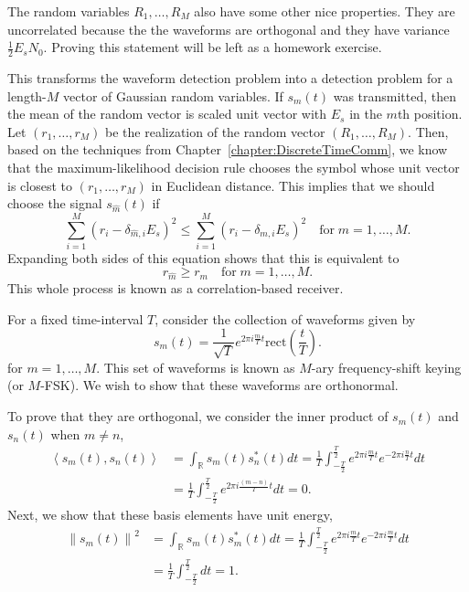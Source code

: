 The random variables $R_1, \ldots , R_M$ also have some other nice properties.
They are uncorrelated because the the waveforms are orthogonal and they have variance $\frac{1}{2}E_s N_0$.
Proving this statement will be left as a homework exercise.

This transforms the waveform detection problem into a detection problem for a length-$M$ vector of Gaussian random variables.
If $s_m (t)$ was transmitted, then the mean of the random vector is scaled unit vector with $E_s$ in the $m$th position.
Let $(r_1, \ldots, r_M)$ be the realization of the random vector $(R_1,\ldots,R_M)$.
Then, based on the techniques from Chapter~\ref{chapter:DiscreteTimeComm}, we know that the maximum-likelihood decision rule chooses the symbol whose unit vector is closest to $(r_1,\ldots,r_M)$ in Euclidean distance.
This implies that we should choose the signal $s_{\hat{m}}(t)$ if
\[ \sum_{i=1}^M (r_i - \delta_{\hat{m},i} E_s)^2 \leq \sum_{i=1}^M (r_i - \delta_{m,i} E_s)^2 \quad \mathrm{for}\; m=1,\ldots,M. \]
Expanding both sides of this equation shows that this is equivalent to
\[ r_{\hat{m}} \geq r_m \quad \mathrm{for}\; m=1,\ldots,M. \]
This whole process is known as a correlation-based receiver.


\begin{example} \label{example:TSpacedTruncatedSinusoids}
For a fixed time-interval $T$, consider the collection of waveforms given by
\begin{equation*}
s_m(t) = \frac{1}{\sqrt{T}} e^{2 \pi i \frac{m}{T} t} \mathrm{rect} \left( \frac{t}{T} \right) .
\end{equation*}
for $m = 1, \ldots, M$.
This set of waveforms is known as $M$-ary frequency-shift keying (or $M$-FSK).
We wish to show that these waveforms are orthonormal.

To prove that they are orthogonal, we consider the inner product of $s_m(t)$ and $s_n(t)$ when $m \neq n$,
\begin{equation*}
\begin{split}
\left\langle s_m (t), s_n (t) \right\rangle
&= \int_{\mathbb{R}} s_m (t) s_n^* (t) dt 
= \frac{1}{T} \int_{-\frac{T}{2}}^{\frac{T}{2}}
e^{2 \pi i \frac{m}{T} t} e^{- 2 \pi i \frac{n}{T} t} dt \\
&= \frac{1}{T} \int_{-\frac{T}{2}}^{\frac{T}{2}}
e^{2 \pi i \frac{(m-n)}{T} t} dt
= 0 .
\end{split}
\end{equation*}
Next, we show that these basis elements have unit energy,
\begin{equation*}
\begin{split}
\left\| s_m(t) \right\|^2
&= \int_{\mathbb{R}} s_m (t) s_m^* (t) dt 
= \frac{1}{T} \int_{-\frac{T}{2}}^{\frac{T}{2}}
e^{2 \pi i \frac{m}{T} t} e^{- 2 \pi i \frac{m}{T} t} dt \\
&= \frac{1}{T} \int_{-\frac{T}{2}}^{\frac{T}{2}} dt
= 1 .
\end{split}
\end{equation*}
\end{example}

